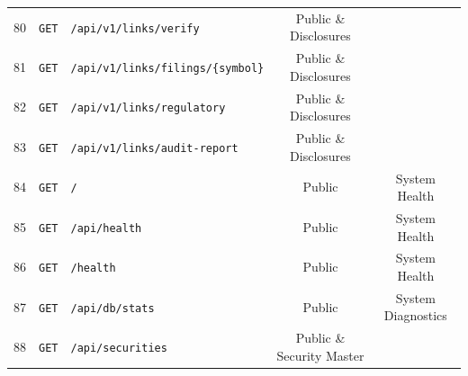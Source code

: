 \begin{small}
\begin{xltabular}{\textwidth}{llp{7.2cm}cc}
80 & \texttt{GET} & \texttt{/api/v1/links/verify} & Public \& Disclosures \\
81 & \texttt{GET} & \texttt{/api/v1/links/filings/\{symbol\}} & Public \& Disclosures \\
82 & \texttt{GET} & \texttt{/api/v1/links/regulatory} & Public \& Disclosures \\
83 & \texttt{GET} & \texttt{/api/v1/links/audit-report} & Public \& Disclosures \\
84 & \texttt{GET} & \texttt{/} & Public & System Health \\
85 & \texttt{GET} & \texttt{/api/health} & Public & System Health \\
86 & \texttt{GET} & \texttt{/health} & Public & System Health \\
87 & \texttt{GET} & \texttt{/api/db/stats} & Public & System Diagnostics \\
88 & \texttt{GET} & \texttt{/api/securities} & Public \& Security Master \\
\end{xltabular}
\end{small}
